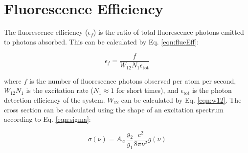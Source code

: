 



\section{Fluorescence Efficiency}
\label{sec:fluorEff}

The fluorescence efficiency ($\epsilon_{f}$) is the ratio of total fluorescence photons emitted to photons absorbed.  This can be calculated by Eq. \ref{eqn:flueEff}:

\begin{equation}
\epsilon_{f} = \frac{f}{W_{12} N_1 \epsilon_{\text{tot}}}
\label{eqn:flueEff}
\end{equation}

\noindent
where $f$ is the number of fluorescence photons observed per atom per second, $W_{12} N_1$ is the excitation rate ($N_1 \approx 1$ for short times), and $\epsilon_{\text{tot}}$ is the photon detection efficiency of the system.  $W_{12}$ can be calculated by Eq. \ref{eqn:w12}.  The cross section can be calculated using the shape of an excitation spectrum according to Eq. \ref{eqn:sigma}:

\begin{equation}
\sigma(\nu) = A_{21} \frac{g_2}{g_1} \frac{c^2}{8 \pi \nu^2} g(\nu)
\label{eqn:sigma}
\end{equation}


